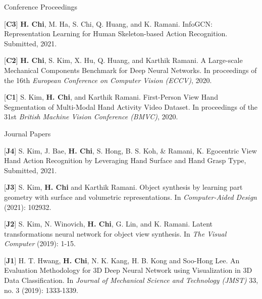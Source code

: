


\begin{cventries}
\cvpub
{Conference Proceedings} %
{ %
\begin{cvitems}
\item {[\textbf{C3}] \textbf{H. Chi}, M. Ha, S. Chi, Q. Huang, and K. Ramani. InfoGCN: Representation Learning for Human Skeleton-based Action Recognition. Submitted, 2021.}
\item {[\textbf{C2}] \textbf{H. Chi}, S. Kim, X. Hu, Q. Huang, and Karthik Ramani. A Large-scale Mechanical Components Benchmark for Deep Neural Networks. In proceedings of the 16th \textit{European Conference on Computer Vision (ECCV)}, 2020.}
\item {[\textbf{C1}] S. Kim, \textbf{H. Chi}, and Karthik Ramani. First-Person View Hand Segmentation of Multi-Modal Hand Activity Video Dataset. In proceedings of the 31st \textit{British Machine Vision Conference (BMVC)}, 2020.}
\end{cvitems}
}


\cvpub
{Journal Papers} %
{ %
\begin{cvitems}
\item {[\textbf{J4}] S. Kim, J. Bae, \textbf{H. Chi}, S. Hong, B. S. Koh, \& Ramani, K. Egocentric View Hand Action Recognition by Leveraging Hand Surface and Hand Grasp Type, Submitted, 2021.}
\item {[\textbf{J3}] S. Kim, \textbf{H. Chi} and Karthik Ramani. Object synthesis by learning part geometry with surface and volumetric representations. In \textit{Computer-Aided Design} (2021): 102932.}
\item {[\textbf{J2}] S. Kim, N. Winovich, \textbf{H. Chi}, G. Lin, and K. Ramani. Latent transformations neural network for object view synthesis. In \textit{The Visual Computer} (2019): 1-15.}
\item {[\textbf{J1}] H. T. Hwang, \textbf{H. Chi}, N. K. Kang, H. B. Kong and Soo-Hong Lee. An Evaluation Methodology for 3D Deep Neural Network using Visualization in 3D Data Classification. In \textit{Journal of Mechanical Science and Technology (JMST)} 33, no. 3 (2019): 1333-1339.}
\end{cvitems}
}


\end{cventries}
